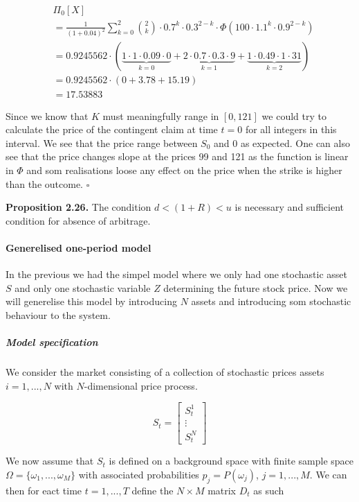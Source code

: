 \documentclass[
]{article}
\begin{document}
\begin{align*}
&\Pi_0[X]\\
&=\frac{1}{(1+0.04)^2}\sum_{k=0}^2\binom{2}{k}\cdot0.7^k\cdot0.3^{2-k}\cdot\Phi(100\cdot 1.1^k\cdot0.9^{2-k})\\
&=0.9245562\cdot\left(\underbrace{1\cdot 1\cdot0.09\cdot0}_{k=0}+\underbrace{2\cdot 0.7\cdot0.
3\cdot 9}_{k=1}+\underbrace{1\cdot 0.49\cdot1\cdot31}_{k=2}\right)\\
&=0.9245562\cdot\left(0+3.78+15.19\right)\\
&=17.53883
\end{align*}

Since we know that \(K\) must meaningfully range in \([0,121]\) we could
try to calculate the price of the contingent claim at time \(t=0\) for
all integers in this interval. We see that the price range between
\(S_0\) and 0 as expected. One can also see that the price changes slope
at the prices 99 and 121 as the function is linear in \(\Phi\) and som
realisations loose any effect on the price when the strike is higher
than the outcome. \(\square\)

\textbf{Proposition 2.26.} The condition \(d<(1+R)<u\) is necessary and
sufficient condition for absence of arbitrage.

\hypertarget{generelised-one-period-model}{%
\paragraph{Generelised one-period
model}\label{generelised-one-period-model}}

In the previous we had the simpel model where we only had one stochastic
asset \(S\) and only one stochastic variable \(Z\) determining the
future stock price. Now we will generelise this model by introducing
\(N\) assets and introducing som stochastic behaviour to the system.

\hypertarget{model-specification}{%
\subparagraph{Model specification}\label{model-specification}}

We consider the market consisting of a collection of stochastic prices
assets \(i=1,...,N\) with \(N\)-dimensional price process.

\[
S_t=\begin{bmatrix} S_t^1\\
\vdots\\
S_t^N\end{bmatrix}
\]

We now assume that \(S_t\) is defined on a background space with finite
sample space \(\Omega = \{\omega_1,...,\omega_M\}\) with associated
probabilities \(p_j=P(\omega_j)\), \(j=1,...,M\). We can then for eact
time \(t=1,...,T\) define the \(N\times M\) matrix \(D_t\) as such
\end{document}
